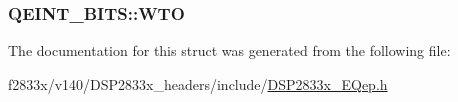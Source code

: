 \subsubsection[{W\+T\+O}]{ Q\+E\+I\+N\+T\+\_\+\+B\+I\+T\+S\+::\+W\+T\+O}\label{struct_q_e_i_n_t___b_i_t_s_a01c31e270088664ce3f3faa43990538a}


The documentation for this struct was generated from the following file\+:\begin{DoxyCompactItemize}
\item 
f2833x/v140/\+D\+S\+P2833x\+\_\+headers/include/\hyperlink{_d_s_p2833x___e_qep_8h}{D\+S\+P2833x\+\_\+\+E\+Qep.\+h}\end{DoxyCompactItemize}

